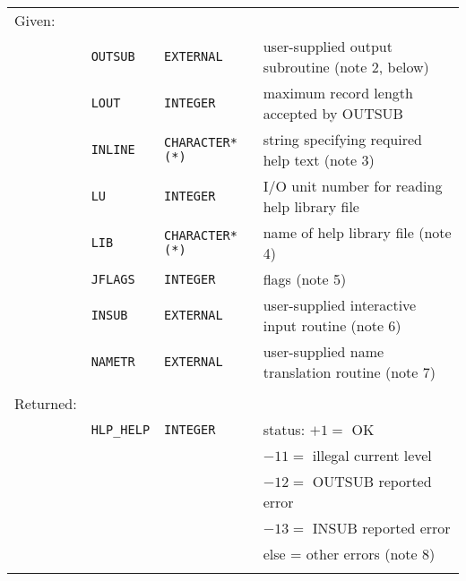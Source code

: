 \documentclass[11pt,nolof]{starlink}
\begin{document}
\begin{tabular}{llll}
\\
Given: \\
& \texttt{OUTSUB} & \texttt{EXTERNAL} &
                   user-supplied output subroutine (note 2, below) \\
& \texttt{LOUT} & \texttt{INTEGER} &
                          maximum record length accepted by OUTSUB \\
& \texttt{INLINE} & \texttt{CHARACTER*(*)} &
                     string specifying required help text (note 3) \\
& \texttt{LU} & \texttt{INTEGER} &
                     I/O unit number for reading help library file \\
& \texttt{LIB} & \texttt{CHARACTER*(*)} &
                                name of help library file (note 4) \\
& \texttt{JFLAGS} & \texttt{INTEGER} &
                                                    flags (note 5) \\
& \texttt{INSUB} & \texttt{EXTERNAL} &
                  user-supplied interactive input routine (note 6) \\
& \texttt{NAMETR} & \texttt{EXTERNAL} &
                   user-supplied name translation routine (note 7) \\ \\
Returned: \\
& \texttt{HLP\_HELP} & \texttt{INTEGER} &
                              status:  $+1=$ OK \\
& & & \hspace{2.6em}               $-11=$ illegal current level \\
& & & \hspace{2.6em}               $-12=$ OUTSUB reported error \\
& & & \hspace{2.6em}               $-13=$ INSUB reported error \\
& & & \hspace{2.75em}             else = other errors (note 8) \\ \\
\end{tabular}
\end{document}
